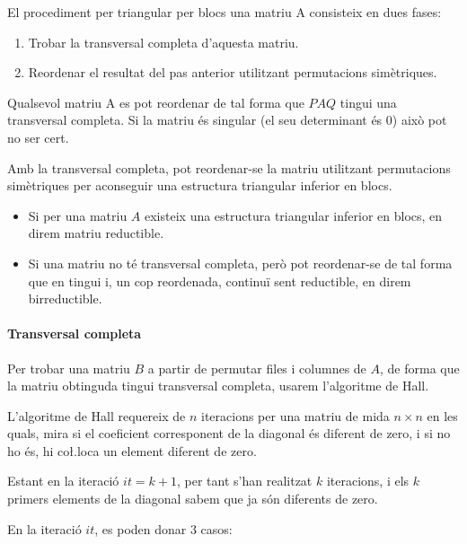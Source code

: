 \documentclass[11pt,a4paper,twoside]{report}
\begin{document}
El procediment per triangular per blocs una matriu A consisteix en dues fases:
\begin{enumerate}
\item Trobar la transversal completa d'aquesta matriu.
\item Reordenar el resultat del pas anterior utilitzant permutacions simètriques.
\end{enumerate}

Qualsevol matriu A es pot reordenar de tal forma que $PAQ$ tingui una transversal completa. Si la matriu és singular (el seu determinant és 0) això pot no ser cert.

Amb la transversal completa, pot reordenar-se la matriu utilitzant permutacions simètriques per aconseguir una estructura triangular inferior en blocs.

\begin{itemize}
\item Si per una matriu $A$ existeix una estructura triangular inferior en blocs, en direm matriu reductible.\\
\item Si una matriu no té transversal completa, però pot reordenar-se de tal forma que en tingui i, un cop reordenada, continuï sent reductible, en direm birreductible.
\end{itemize}

\paragraph{Transversal completa} \mbox{}

Per trobar una matriu $B$ a partir de permutar files i columnes de $A$, de forma que la matriu obtinguda tingui transversal completa, usarem l'algoritme de Hall.

L'algoritme de Hall requereix de $n$ iteracions per una matriu de mida $n \times n$ en les quals, mira si el coeficient corresponent de la diagonal és diferent de zero, i si no ho és, hi co\l.loca un element diferent de zero.

Estant en la iteració $it = k+1$, per tant s'han realitzat $k$ iteracions, i els $k$ primers elements de la diagonal sabem que ja són diferents de zero. 

En la iteració $it$, es poden donar 3 casos:
\end{document}
